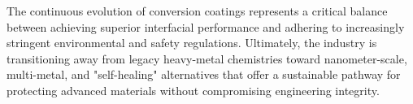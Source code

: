 \documentclass[12pt]{article}
\begin{document}
            The continuous evolution of conversion coatings represents a critical balance between achieving superior interfacial performance and adhering to increasingly stringent environmental and safety regulations. Ultimately, the industry is transitioning away from legacy heavy-metal chemistries toward nanometer-scale, multi-metal, and "self-healing" alternatives that offer a sustainable pathway for protecting advanced materials without compromising engineering integrity.



    \newpage
    \printbibliography[title=Works Cited]

\end{document}
